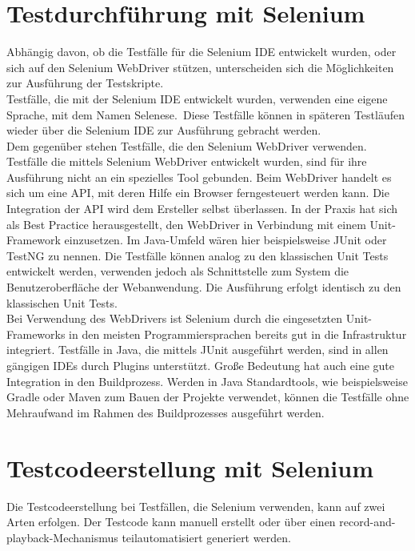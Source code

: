 \section{Testdurchführung mit Selenium}
\label{sec:testdurchführung_mit_selenium}
Abhängig davon, ob die Testfälle für die Selenium IDE entwickelt wurden, oder sich auf den Selenium WebDriver stützen, unterscheiden sich die Möglichkeiten zur Ausführung der Testskripte.\\
Testfälle, die mit der Selenium IDE entwickelt wurden, verwenden eine eigene Sprache, mit dem Namen \grq Selenese\grq.\ Diese Testfälle können in späteren Testläufen wieder über die Selenium IDE zur Ausführung gebracht werden. \\
Dem gegenüber stehen Testfälle, die den Selenium WebDriver verwenden.
Testfälle die mittels Selenium WebDriver entwickelt wurden, sind für ihre Ausführung nicht an ein spezielles Tool gebunden. Beim WebDriver handelt es sich um eine API, mit deren Hilfe ein Browser ferngesteuert werden kann. Die Integration der API wird dem Ersteller selbst überlassen. In der Praxis hat sich als Best Practice herausgestellt, den WebDriver in Verbindung mit einem Unit-Framework einzusetzen.
Im Java-Umfeld wären hier beispielsweise JUnit oder TestNG zu nennen.
Die Testfälle können analog zu den klassischen Unit Tests entwickelt werden, verwenden jedoch als Schnittstelle zum System die Benutzeroberfläche der Webanwendung. 
Die Ausführung erfolgt identisch zu den klassischen Unit Tests.\\
Bei Verwendung des WebDrivers ist Selenium durch die eingesetzten Unit-Frameworks in den meisten Programmiersprachen bereits gut in die Infrastruktur integriert. Testfälle in Java, die mittels JUnit ausgeführt werden, sind in allen gängigen IDEs durch Plugins unterstützt. Große Bedeutung hat auch eine gute Integration in den Buildprozess. Werden in Java Standardtools, wie beispielsweise Gradle oder Maven zum Bauen der Projekte verwendet, können die Testfälle ohne Mehraufwand im Rahmen des Buildprozesses ausgeführt werden.



\section{Testcodeerstellung mit Selenium}
\label{sec:Testdesign}
Die Testcodeerstellung bei Testfällen, die Selenium verwenden, kann auf zwei Arten erfolgen.
Der Testcode kann manuell erstellt oder über einen \grq record-and-playback\grq -Mechanismus teilautomatisiert generiert werden.

